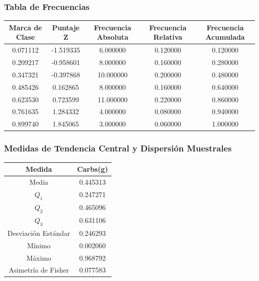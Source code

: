 \documentclass[12pt,a4paper]{article}
\begin{document}
    \subsubsection{Tabla de Frecuencias}
        \begin{center}
            \begin{tabular}{|c|c|c|c|c|}
                \hline
                Marca de Clase & Puntaje Z & Frecuencia Absoluta & Frecuencia Relativa & Frecuencia Acumulada \\
                \hline
                0.071112 & -1.519335 & 6.000000 & 0.120000 & 0.120000 \\
                0.209217 & -0.958601 & 8.000000 & 0.160000 & 0.280000 \\
                0.347321 & -0.397868 & 10.000000 & 0.200000 & 0.480000 \\
                0.485426 &  0.162865 & 8.000000 & 0.160000 & 0.640000 \\
                0.623530 &  0.723599 & 11.000000 & 0.220000 & 0.860000 \\
                0.761635 &  1.284332 & 4.000000 & 0.080000 & 0.940000 \\
                0.899740 &  1.845065 & 3.000000 & 0.060000 & 1.000000 \\
                \hline
            \end{tabular}
        \end{center} 

    \subsubsection{Medidas de Tendencia Central y Dispersión Muestrales}
        \begin{center}
            \begin{tabular}{|c|c|}
                \hline
                Medida & Carbs(g) \\
                \hline
                Media & 0.445313 \\
                $Q_1$ & 0.247271 \\
                $Q_2$ & 0.465096 \\
                $Q_3$ & 0.631106 \\
                Desviación Estándar & 0.246293 \\
                Mínimo & 0.002060 \\
                Máximo & 0.968792 \\
                Asimetría de Fisher & 0.077583 \\
                \hline
                \end{tabular}
        \end{center}
    
\end{document}
